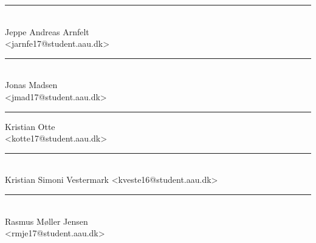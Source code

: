 \begin{minipage}[b]{0.45\textwidth}
    \centering
        \rule{\textwidth}{0.5pt}\\
            Jeppe Andreas Arnfelt\\
            {\footnotesize <jarnfe17@student.aau.dk>}
\end{minipage}
\hfill
\vspace{3\baselineskip}
\begin{minipage}[b]{0.45\textwidth}
    \centering
        \rule{\textwidth}{0.5pt}\\
            Jonas Madsen\\
            {\footnotesize <jmad17@student.aau.dk>}
\end{minipage}

\vspace{3\baselineskip}  
\begin{center}
\begin{minipage}[b]{0.45\textwidth}
    \centering
        \rule{\textwidth}{0.5pt}
            Kristian Otte\\
            {\footnotesize <kotte17@student.aau.dk>}
\end{minipage}
\hfill
\begin{minipage}[b]{0.45\textwidth}
    \centering 
        \rule{\textwidth}{0.5pt}\\
            Kristian Simoni Vestermark
            {\footnotesize <kveste16@student.aau.dk>}
\end{minipage}

\vfill
\vspace{\baselineskip}
\vspace{\baselineskip}
\begin{minipage}[b]{0.45\textwidth}
    \centering
        \rule{\textwidth}{0.5pt}\\
            Rasmus Møller Jensen\\
            {\footnotesize <rmje17@student.aau.dk>}
\end{minipage}
\hfill
\end{center}